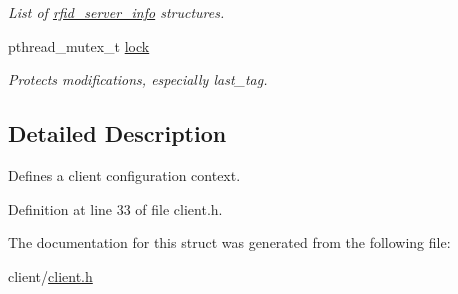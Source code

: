 \begin{DoxyCompactItemize}
\begin{DoxyCompactList}\small\item\em List of \hyperlink{structrfid__server__info}{rfid\_\-server\_\-info} structures. \item\end{DoxyCompactList}\item 
\hypertarget{structclient__config_a0abaf4b5d42c4e5d19190035fade3599}{
pthread\_\-mutex\_\-t \hyperlink{structclient__config_a0abaf4b5d42c4e5d19190035fade3599}{lock}}
\label{structclient__config_a0abaf4b5d42c4e5d19190035fade3599}

\begin{DoxyCompactList}\small\item\em Protects modifications, especially last\_\-tag. \item\end{DoxyCompactList}\end{DoxyCompactItemize}


\subsection{Detailed Description}
Defines a client configuration context. 

Definition at line 33 of file client.h.



The documentation for this struct was generated from the following file:\begin{DoxyCompactItemize}
\item 
client/\hyperlink{client_8h}{client.h}\end{DoxyCompactItemize}
